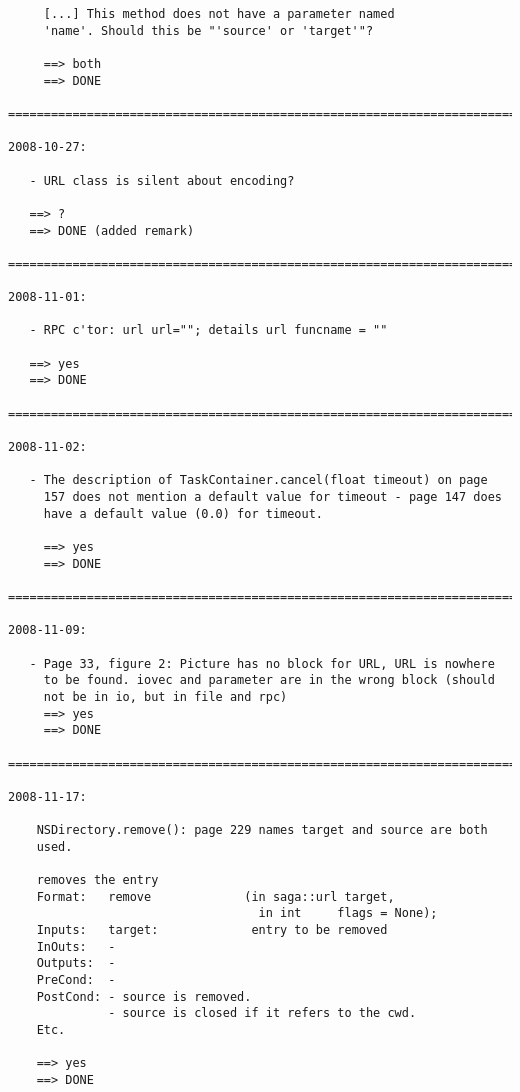 \documentclass{article}
\begin{document}
\begin{verbatim}
     [...] This method does not have a parameter named
     'name'. Should this be "'source' or 'target'"? 

     ==> both
     ==> DONE

=========================================================================

2008-10-27:

   - URL class is silent about encoding?

   ==> ?
   ==> DONE (added remark)

=========================================================================

2008-11-01:

   - RPC c'tor: url url=""; details url funcname = ""

   ==> yes
   ==> DONE

=========================================================================

2008-11-02:

   - The description of TaskContainer.cancel(float timeout) on page
     157 does not mention a default value for timeout - page 147 does 
     have a default value (0.0) for timeout.

     ==> yes
     ==> DONE

=========================================================================

2008-11-09:

   - Page 33, figure 2: Picture has no block for URL, URL is nowhere
     to be found. iovec and parameter are in the wrong block (should 
     not be in io, but in file and rpc)                                                                                                                   
     ==> yes
     ==> DONE

=========================================================================

2008-11-17:

    NSDirectory.remove(): page 229 names target and source are both
    used.
    
    removes the entry
    Format:   remove             (in saga::url target,
                                   in int     flags = None);
    Inputs:   target:             entry to be removed
    InOuts:   -
    Outputs:  -
    PreCond:  -
    PostCond: - source is removed.
              - source is closed if it refers to the cwd.
    Etc.

    ==> yes
    ==> DONE


\end{verbatim}
\end{document}
